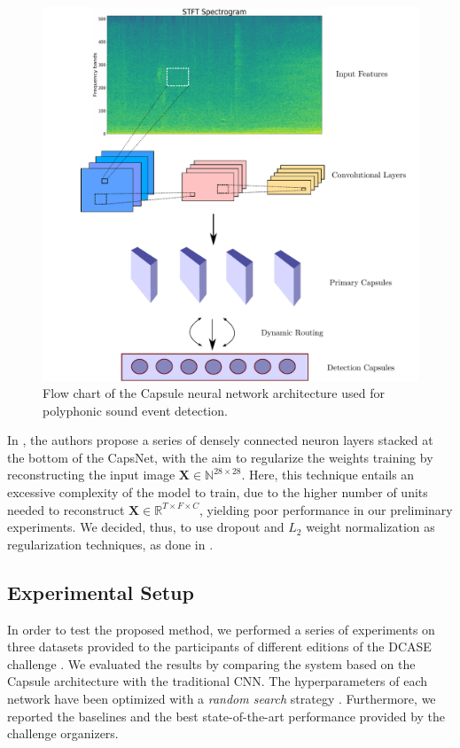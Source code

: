 \begin{figure}[htbp]
	\centering
	\includegraphics[width=\columnwidth]{img/flow_chart_2}
	\caption[Polyphonic SED with CapsNets]{Flow chart of the Capsule neural network architecture used for polyphonic sound event detection.}
	\label{fig:flowchart_capsulesed}
\end{figure}

In \cite{sabour2017dynamic}, the authors propose a series of densely connected neuron layers stacked at the bottom of the CapsNet, with the aim to regularize the weights training by reconstructing the input image $\mathbf{X} \in \mathbb{N}^{28 \times 28}$. Here, this technique entails an excessive complexity of the model to train, due to the higher number of units needed to reconstruct $\mathbf{X} \in \mathbb{R}^{T \times F \times C}$, yielding poor performance in our preliminary experiments. We decided, thus, to use dropout \cite{srivastava2014dropout} and $L_2$ weight normalization \cite{hoerl1970ridge} as regularization techniques, as done in \cite{iqbal2018capsule}.

\subsection{Experimental Setup}


In order to test the proposed method, we performed a series of experiments on three datasets provided to the participants of different editions of the DCASE challenge \cite{DCASE2017challenge, mesaros2016tut}. We evaluated the results by comparing the system based on the Capsule architecture with the traditional CNN. The hyperparameters of each network have been optimized with a \textit{random search} strategy \cite{bergstra2012random}. Furthermore, we reported the baselines and the best state-of-the-art performance provided by the challenge organizers.

